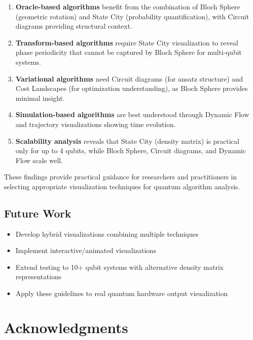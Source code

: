 \documentclass[12pt,a4paper]{article}
\begin{document}
\begin{enumerate}
	\item \textbf{Oracle-based algorithms} benefit from the combination of Bloch Sphere (geometric rotation) and State City (probability quantification), with Circuit diagrams providing structural context.

	\item \textbf{Transform-based algorithms} require State City visualization to reveal phase periodicity that cannot be captured by Bloch Sphere for multi-qubit systems.

	\item \textbf{Variational algorithms} need Circuit diagrams (for ansatz structure) and Cost Landscapes (for optimization understanding), as Bloch Sphere provides minimal insight.

	\item \textbf{Simulation-based algorithms} are best understood through Dynamic Flow and trajectory visualizations showing time evolution.

	\item \textbf{Scalability analysis} reveals that State City (density matrix) is practical only for up to 4 qubits, while Bloch Sphere, Circuit diagrams, and Dynamic Flow scale well.
\end{enumerate}

These findings provide practical guidance for researchers and practitioners in selecting appropriate visualization techniques for quantum algorithm analysis.

\subsection{Future Work}

\begin{itemize}
	\item Develop hybrid visualizations combining multiple techniques
	\item Implement interactive/animated visualizations
	\item Extend testing to 10+ qubit systems with alternative density matrix representations
	\item Apply these guidelines to real quantum hardware output visualization
\end{itemize}

\newpage

\section*{Acknowledgments}
\end{document}
